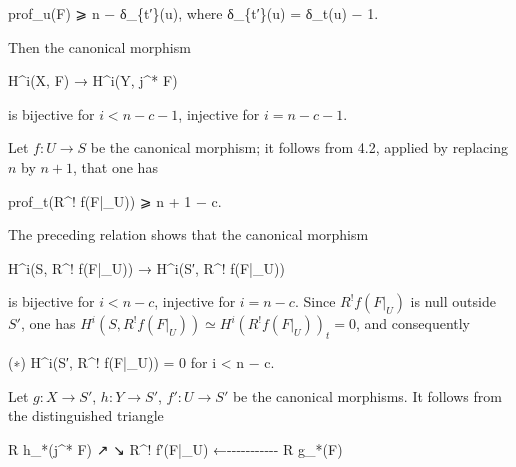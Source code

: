 \documentclass[
]{article}
\newenvironment{Shaded}{}{}
\newcommand{\NormalTok}[1]{#1}
\begin{document}
\begin{Shaded}
\begin{Highlighting}[]
\NormalTok{prof\_u(F) ⩾ n − δ\_\{t′\}(u), where δ\_\{t′\}(u) = δ\_t(u) − 1.}
\end{Highlighting}
\end{Shaded}

Then the canonical morphism

\begin{Shaded}
\begin{Highlighting}[]
\NormalTok{H\^{}i(X, F) → H\^{}i(Y, j\^{}* F)}
\end{Highlighting}
\end{Shaded}

is bijective for \(i < n - c - 1\), injective for \(i = n - c - 1\).

Let \(f : U \to S\) be the canonical morphism; it follows from 4.2,
applied by replacing \(n\) by \(n + 1\), that one has

\begin{Shaded}
\begin{Highlighting}[]
\NormalTok{prof\_t(R\^{}! f(F|\_U)) ⩾ n + 1 − c.}
\end{Highlighting}
\end{Shaded}

The preceding relation shows that the canonical morphism

\begin{Shaded}
\begin{Highlighting}[]
\NormalTok{H\^{}i(S, R\^{}! f(F|\_U)) → H\^{}i(S′, R\^{}! f(F|\_U))}
\end{Highlighting}
\end{Shaded}

is bijective for \(i < n - c\), injective for \(i = n - c\). Since
\(R^{!} f(F|_{U})\) is null outside \(S'\), one has
\(H^{i}(S, R^{!} f(F|_{U})) \simeq H^{i}(R^{!} f(F|_{U}))_{t} = 0\), and
consequently

\begin{Shaded}
\begin{Highlighting}[]
\NormalTok{(∗) H\^{}i(S′, R\^{}! f(F|\_U)) = 0 for i \textless{} n − c.}
\end{Highlighting}
\end{Shaded}

Let \(g : X \to S'\), \(h : Y \to S'\), \(f' : U \to S'\) be the
canonical morphisms. It follows from the distinguished triangle

\begin{Shaded}
\begin{Highlighting}[]
\NormalTok{              R h\_*(j\^{}* F)}
\NormalTok{             ↗            ↘}
\NormalTok{   R\^{}! f′(F|\_U) ←{-}{-}{-}{-}{-}{-}{-}{-}{-}{-}{-} R g\_*(F)}
\end{Highlighting}
\end{Shaded}
\end{document}
